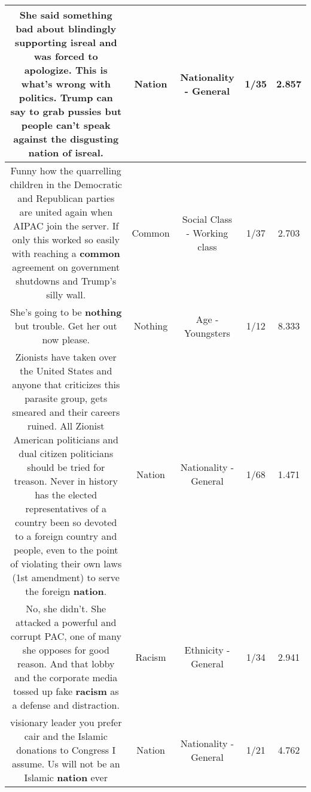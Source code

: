\documentclass[11pt]{article}
\newlength\mylength
\begin{document}
\begin{center}
\begin{longtable}{|C{.65\mylength}|C{.30\mylength}|C{.12\mylength}|C{.12\mylength}|C{.12\mylength}|}
  \small She said something bad about blindingly supporting isreal and was forced to apologize. This is what's wrong with politics. Trump can say to grab pussies but people can't speak against the disgusting \textbf{nation} of isreal.\normalsize   & Nation & Nationality - General & 1/35 & 2.857 \\  \hline
  \small Funny how the quarrelling children in the Democratic and Republican parties are united again when AIPAC join the server. If only this worked so easily with reaching a \textbf{common} agreement on government shutdowns and Trump's silly wall.\normalsize   & Common & Social Class - Working class & 1/37 & 2.703 \\  \hline
  \small She's going to be \textbf{nothing} but trouble. Get her out now please.\normalsize   & Nothing & Age - Youngsters & 1/12 & 8.333 \\  \hline
  \small Zionists have taken over the United States and anyone that criticizes this parasite group, gets smeared and their careers ruined. All Zionist American politicians and dual citizen politicians should be tried for treason. Never in history has the elected representatives of a country been so devoted to a foreign country and people, even to the point of violating their own laws (1st amendment) to serve the foreign \textbf{nation}.\normalsize   & Nation & Nationality - General & 1/68 & 1.471 \\  \hline
  \small No, she didn't.  She attacked a powerful and corrupt PAC, one of many she opposes for good reason.  And that lobby and the corporate media tossed up fake \textbf{racism} as a defense and distraction.\normalsize   & Racism & Ethnicity - General & 1/34 & 2.941 \\  \hline
  \small visionary leader you prefer cair and the Islamic donations to Congress I assume. Us will not be an Islamic \textbf{nation} ever\normalsize   & Nation & Nationality - General & 1/21 & 4.762 \\  \hline

\end{longtable}
\end{center}
\end{document}
